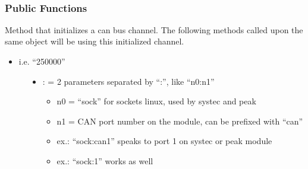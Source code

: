 \documentclass[a4paper,10pt,english]{sphinxmanual}
\begin{document}
\begin{fulllineitems}
\label{\detokenize{vendors/peak:_CPPv412CSockCanScan}}%
\pysigstartmultiline
{}%
\pysigstopmultiline~\subsubsection*{Public Functions}

\begin{fulllineitems}
\label{\detokenize{vendors/peak:_CPPv4N12CSockCanScan9createBusEK6string6string}}%
\pysigstartmultiline
{}%
\pysigstopmultiline
Method that initializes a can bus channel. The following methods called upon the same object will be using this initialized channel.

\begin{itemize}
\item {} 
i.e. “250000”

\end{itemize}
\begin{description}
\item[{}] \leavevmode\begin{itemize}
\item {} 
: = 2 parameters separated by “:”, like “n0:n1”\begin{itemize}
\item {} 
n0 = “sock” for sockets linux, used by systec and peak

\item {} 
n1 = CAN port number on the module, can be prefixed with “can”

\item {} 
ex.: “sock:can1” speaks to port 1 on systec or peak module

\item {} 
ex.: “sock:1” works as well


\end{itemize}
\end{itemize}
\end{description}
\end{fulllineitems}
\end{fulllineitems}
\end{document}
